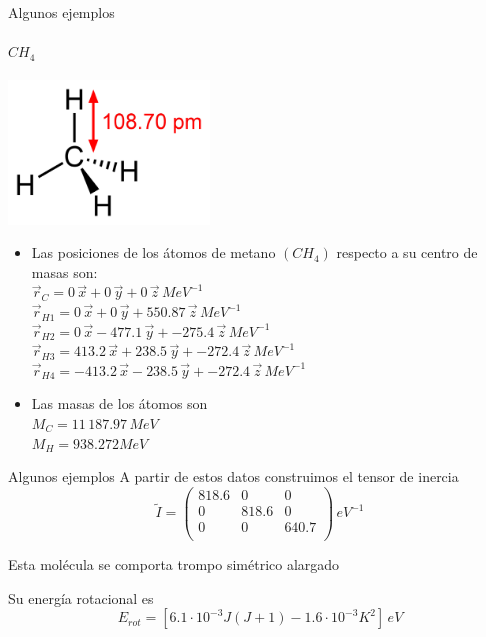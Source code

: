 \documentclass[a4paper]{beamer}
\begin{document}
\begin{frame}{Algunos ejemplos}
\framesubtitle{$CH_4$}
\includegraphics[width=0.4\textwidth]{metano.png}\\
\begin{itemize}
\item Las posiciones de los átomos  de metano $(CH_4)$ respecto a su centro de masas son:\\
 $\vec r_C = 0\, \vec x + 0 \, \vec y + 0 \, \vec z \, MeV^{-1}$\\
 $\vec r_{H1} = 0\, \vec x+0 \, \vec y + 550.87 \, \vec z \, MeV^{-1}$\\
 $\vec r_{H2} = 0\, \vec x -477.1 \, \vec y + -275.4\, \vec z \, MeV^{-1}$\\
 $\vec r_{H3} = 413.2\, \vec x + 238.5 \, \vec y + -272.4 \, \vec z \, MeV^{-1}$\\
 $\vec r_{H4} = -413.2 \, \vec x -238.5 \, \vec y + -272.4 \, \vec z \, MeV^{-1}$\\
 
\item Las masas de los átomos son\\
 $M_C = 11\, 187.97 \, MeV$\\
 $M_H = 938.272 MeV$\\
\end{itemize}
\end{frame}

\begin{frame}{Algunos ejemplos}
 A partir de estos datos construimos el tensor de inercia
 $$ \tilde I =
 \begin{pmatrix}
 818.6 & 0 & 0 \\
 0 & 818.6 & 0 \\
 0 & 0 & 640.7\\
 \end{pmatrix}
 \, eV^{-1}
 $$
 
Esta molécula se comporta trompo simétrico alargado

Su energía rotacional es
 $$E_{rot}=[6.1\cdot 10^{-3}J(J+1) -1.6 \cdot 10^{-3}K^2] \, eV$$
\end{frame}
\end{document}
